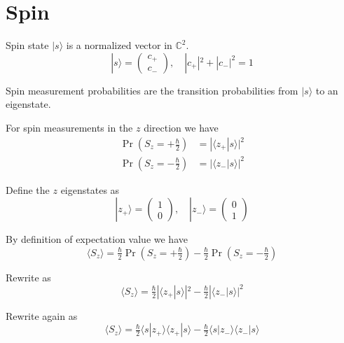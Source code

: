 


\section*{Spin}

Spin state $|s\rangle$ is a normalized vector in $\mathbb C^2$.
\begin{equation*}
|s\rangle=\begin{pmatrix}c_+\\c_-\end{pmatrix},\quad|c_+|^2+|c_-|^2=1
\end{equation*}

Spin measurement probabilities are the transition probabilities from $|s\rangle$ to an eigenstate.

\bigskip
For spin measurements in the $z$ direction we have
\begin{align*}
\Pr\left(S_z=+\tfrac{\hbar}{2}\right)&=|\langle z_+|s\rangle|^2
\\
\Pr\left(S_z=-\tfrac{\hbar}{2}\right)&=|\langle z_-|s\rangle|^2
\end{align*}

Define the $z$ eigenstates as
\begin{equation*}
|z_+\rangle=\begin{pmatrix}1\\0\end{pmatrix},\quad
|z_-\rangle=\begin{pmatrix}0\\1\end{pmatrix}
\end{equation*}

By definition of expectation value we have
\begin{equation*}
\langle S_z\rangle
=\tfrac{\hbar}{2}\Pr\left(S_z=+\tfrac{\hbar}{2}\right)
-\tfrac{\hbar}{2}\Pr\left(S_z=-\tfrac{\hbar}{2}\right)
\end{equation*}

Rewrite as
\begin{equation*}
\langle S_z\rangle=\tfrac{\hbar}{2}|\langle z_+|s\rangle|^2-\tfrac{\hbar}{2}|\langle z_-|s\rangle|^2
\end{equation*}

Rewrite again as
\begin{equation*}
\langle S_z\rangle
=\tfrac{\hbar}{2}\langle s|z_+\rangle\langle z_+|s\rangle
-\tfrac{\hbar}{2}\langle s|z_-\rangle\langle z_-|s\rangle
\end{equation*}

